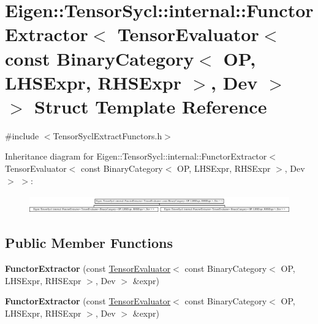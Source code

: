 \hypertarget{struct_eigen_1_1_tensor_sycl_1_1internal_1_1_functor_extractor_3_01_tensor_evaluator_3_01const_08f8f7dde0ee1dac917205b74fcd4dba8}{}\section{Eigen\+:\+:Tensor\+Sycl\+:\+:internal\+:\+:Functor\+Extractor$<$ Tensor\+Evaluator$<$ const Binary\+Category$<$ OP, L\+H\+S\+Expr, R\+H\+S\+Expr $>$, Dev $>$ $>$ Struct Template Reference}
\label{struct_eigen_1_1_tensor_sycl_1_1internal_1_1_functor_extractor_3_01_tensor_evaluator_3_01const_08f8f7dde0ee1dac917205b74fcd4dba8}


{\ttfamily \#include $<$Tensor\+Sycl\+Extract\+Functors.\+h$>$}

Inheritance diagram for Eigen\+:\+:Tensor\+Sycl\+:\+:internal\+:\+:Functor\+Extractor$<$ Tensor\+Evaluator$<$ const Binary\+Category$<$ OP, L\+H\+S\+Expr, R\+H\+S\+Expr $>$, Dev $>$ $>$\+:\begin{figure}[H]
\begin{center}
\leavevmode
\includegraphics[height=0.768176cm]{struct_eigen_1_1_tensor_sycl_1_1internal_1_1_functor_extractor_3_01_tensor_evaluator_3_01const_08f8f7dde0ee1dac917205b74fcd4dba8}
\end{center}
\end{figure}
\subsection*{Public Member Functions}
\begin{DoxyCompactItemize}
\item 
\mbox{\label{struct_eigen_1_1_tensor_sycl_1_1internal_1_1_functor_extractor_3_01_tensor_evaluator_3_01const_08f8f7dde0ee1dac917205b74fcd4dba8_a5a5a439adce3885db90b3f47f8693402}} 
{\bfseries Functor\+Extractor} (const \hyperlink{struct_eigen_1_1_tensor_evaluator}{Tensor\+Evaluator}$<$ const Binary\+Category$<$ OP, L\+H\+S\+Expr, R\+H\+S\+Expr $>$, Dev $>$ \&expr)
\item 
\mbox{\label{struct_eigen_1_1_tensor_sycl_1_1internal_1_1_functor_extractor_3_01_tensor_evaluator_3_01const_08f8f7dde0ee1dac917205b74fcd4dba8_a5a5a439adce3885db90b3f47f8693402}} 
{\bfseries Functor\+Extractor} (const \hyperlink{struct_eigen_1_1_tensor_evaluator}{Tensor\+Evaluator}$<$ const Binary\+Category$<$ OP, L\+H\+S\+Expr, R\+H\+S\+Expr $>$, Dev $>$ \&expr)
\end{DoxyCompactItemize}
